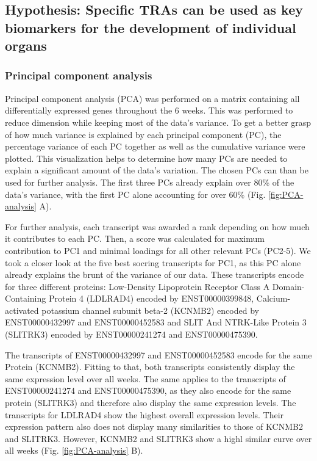 \documentclass[
]{article}
\begin{document}
\hypertarget{hypothesis-specific-tras-can-be-used-as-key-biomarkers-for-the-development-of-individual-organs}{%
\subsection{Hypothesis: Specific TRAs can be used as key biomarkers for the development of individual organs}\label{hypothesis-specific-tras-can-be-used-as-key-biomarkers-for-the-development-of-individual-organs}}

\hypertarget{principal-component-analysis}{%
\subsubsection{Principal component analysis}\label{principal-component-analysis}}

Principal component analysis (PCA) was performed on a matrix containing all differentially expressed genes throughout the 6 weeks. This was performed to reduce dimension while keeping most of the data's variance. To get a better grasp of how much variance is explained by each principal component (PC), the percentage variance of each PC together as well as the cumulative variance were plotted. This visualization helps to determine how many PCs are needed to explain a significant amount of the data's variation. The chosen PCs can than be used for further analysis. The first three PCs already explain over 80\% of the data's variance, with the first PC alone accounting for over 60\% (Fig. \ref{fig:PCA-analysis} A).

For further analysis, each transcript was awarded a rank depending on how much it contributes to each PC. Then, a score was calculated for maximum contribution to PC1 and minimal loadings for all other relevant PCs (PC2-5). We took a closer look at the five best socring transcripts for PC1, as this PC alone already explains the brunt of the variance of our data. These transcripts encode for three different proteins: Low-Density Lipoprotein Receptor Class A Domain-Containing Protein 4 (LDLRAD4) encoded by ENST00000399848, Calcium-activated potassium channel subunit beta-2 (KCNMB2) encoded by ENST00000432997 and ENST00000452583 and SLIT And NTRK-Like Protein 3 (SLITRK3) encoded by ENST00000241274 and ENST00000475390.

The transcripts of ENST00000432997 and ENST00000452583 encode for the same Protein (KCNMB2). Fitting to that, both transcripts consistently display the same expression level over all weeks. The same applies to the transcripts of ENST00000241274 and ENST00000475390, as they also encode for the same protein (SLITRK3) and therefore also display the same expression levels. The transcripts for LDLRAD4 show the highest overall expression levels. Their expression pattern also does not display many similarities to those of KCNMB2 and SLITRK3. However, KCNMB2 and SLITRK3 show a highl similar curve over all weeks (Fig. \ref{fig:PCA-analysis} B).
\end{document}
